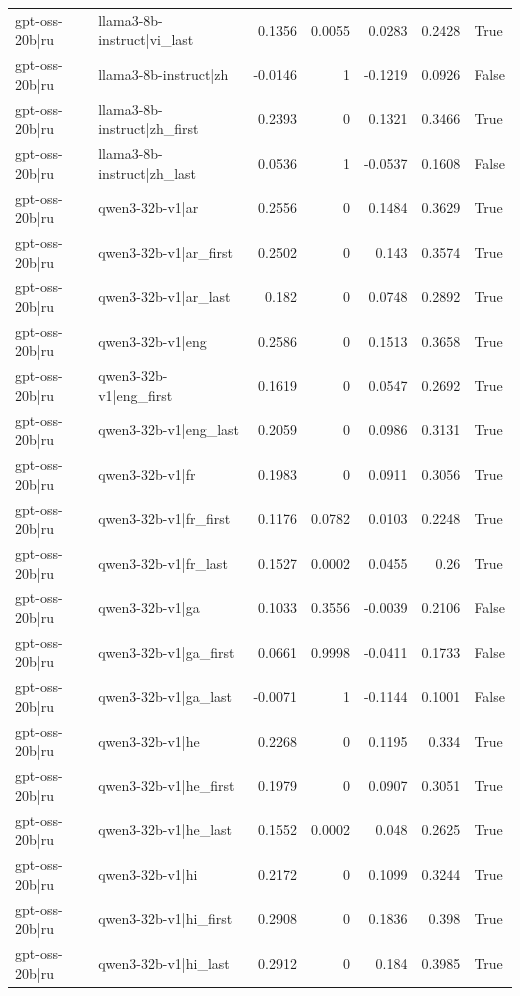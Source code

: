 \begin{table}
\begin{tabular}{l l r r r r l}
gpt-oss-20b|ru & llama3-8b-instruct|vi_last & 0.1356 & 0.0055 & 0.0283 & 0.2428 & True \\
gpt-oss-20b|ru & llama3-8b-instruct|zh & -0.0146 & 1 & -0.1219 & 0.0926 & False \\
gpt-oss-20b|ru & llama3-8b-instruct|zh_first & 0.2393 & 0 & 0.1321 & 0.3466 & True \\
gpt-oss-20b|ru & llama3-8b-instruct|zh_last & 0.0536 & 1 & -0.0537 & 0.1608 & False \\
gpt-oss-20b|ru & qwen3-32b-v1|ar & 0.2556 & 0 & 0.1484 & 0.3629 & True \\
gpt-oss-20b|ru & qwen3-32b-v1|ar_first & 0.2502 & 0 & 0.143 & 0.3574 & True \\
gpt-oss-20b|ru & qwen3-32b-v1|ar_last & 0.182 & 0 & 0.0748 & 0.2892 & True \\
gpt-oss-20b|ru & qwen3-32b-v1|eng & 0.2586 & 0 & 0.1513 & 0.3658 & True \\
gpt-oss-20b|ru & qwen3-32b-v1|eng_first & 0.1619 & 0 & 0.0547 & 0.2692 & True \\
gpt-oss-20b|ru & qwen3-32b-v1|eng_last & 0.2059 & 0 & 0.0986 & 0.3131 & True \\
gpt-oss-20b|ru & qwen3-32b-v1|fr & 0.1983 & 0 & 0.0911 & 0.3056 & True \\
gpt-oss-20b|ru & qwen3-32b-v1|fr_first & 0.1176 & 0.0782 & 0.0103 & 0.2248 & True \\
gpt-oss-20b|ru & qwen3-32b-v1|fr_last & 0.1527 & 0.0002 & 0.0455 & 0.26 & True \\
gpt-oss-20b|ru & qwen3-32b-v1|ga & 0.1033 & 0.3556 & -0.0039 & 0.2106 & False \\
gpt-oss-20b|ru & qwen3-32b-v1|ga_first & 0.0661 & 0.9998 & -0.0411 & 0.1733 & False \\
gpt-oss-20b|ru & qwen3-32b-v1|ga_last & -0.0071 & 1 & -0.1144 & 0.1001 & False \\
gpt-oss-20b|ru & qwen3-32b-v1|he & 0.2268 & 0 & 0.1195 & 0.334 & True \\
gpt-oss-20b|ru & qwen3-32b-v1|he_first & 0.1979 & 0 & 0.0907 & 0.3051 & True \\
gpt-oss-20b|ru & qwen3-32b-v1|he_last & 0.1552 & 0.0002 & 0.048 & 0.2625 & True \\
gpt-oss-20b|ru & qwen3-32b-v1|hi & 0.2172 & 0 & 0.1099 & 0.3244 & True \\
gpt-oss-20b|ru & qwen3-32b-v1|hi_first & 0.2908 & 0 & 0.1836 & 0.398 & True \\
gpt-oss-20b|ru & qwen3-32b-v1|hi_last & 0.2912 & 0 & 0.184 & 0.3985 & True \\

\end{tabular}
\end{table}
